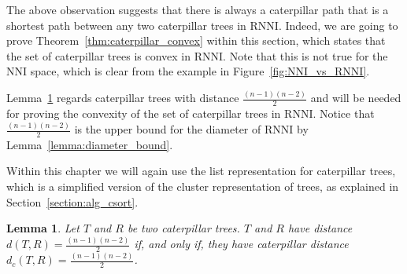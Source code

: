 \documentclass{amsart}
\newcommand{\nni}{\mathrm{NNI}}
\newcommand{\rnni}{\mathrm{RNNI}}
\newtheorem{lemma}[definition]{Lemma}
\begin{document}
The above observation suggests that there is always a caterpillar path that is a shortest path between any two caterpillar trees in $\rnni$.
Indeed, we are going to prove Theorem~\ref{thm:caterpillar_convex} within this section, which states that the set of caterpillar trees is convex in $\rnni$.
Note that this is not true for the $\nni$ space, which is clear from the example in Figure~\ref{fig:NNI_vs_RNNI}.

Lemma~\ref{lemma:caterpillar_dist=diameter} regards caterpillar trees with distance $\frac{(n-1)(n-2)}{2}$ and will be needed for proving the convexity of the set of caterpillar trees in $\rnni$.
Notice that $\frac{(n-1)(n-2)}{2}$ is the upper bound for the diameter of $\rnni$ by Lemma~\ref{lemma:diameter_bound}.

Within this chapter we will again use the list representation for caterpillar trees, which is a simplified version of the cluster representation of trees, as explained in Section~\ref{section:alg_csort}.

\begin{lemma}
    Let $T$ and $R$ be two caterpillar trees.
    $T$ and $R$ have distance $d(T,R) = \frac{(n-1)(n-2)}{2}$ if, and only if, they have caterpillar distance $d_c(T,R) = \frac{(n-1)(n-2)}{2}$.
    \label{lemma:caterpillar_dist=diameter}
\end{lemma}
\end{document}
